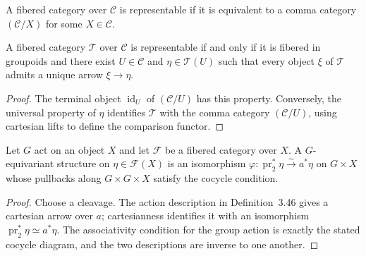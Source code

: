 \begin{definition}\label{fga-def-3-43}
A fibered category over $\mathcal C$ is representable if it is equivalent to a
comma category $(\mathcal C/X)$ for some $X\in\mathcal C$.
\end{definition}

\begin{proposition}\label{fga-pro-3-44}
A fibered category $\mathcal T$ over $\mathcal C$ is representable if and only
if it is fibered in groupoids and there exist $U\in\mathcal C$ and
$\eta\in\mathcal T(U)$ such that every object $\xi$ of $\mathcal T$ admits a
unique arrow $\xi\to\eta$.
\end{proposition}
\begin{proof}
The terminal object $\operatorname{id}_U$ of $(\mathcal C/U)$ has this property.
Conversely, the universal property of $\eta$ identifies $\mathcal T$ with the
comma category $(\mathcal C/U)$, using cartesian lifts to define the comparison
functor.
\end{proof}

\begin{proposition}\label{fga-pro-3-49}\uses{}
Let $G$ act on an object $X$ and let $\mathcal F$ be a fibered category over
$X$.  A $G$-equivariant structure on $\eta\in\mathcal F(X)$ is an isomorphism
$\varphi:\operatorname{pr}_2^*\eta\xrightarrow{\sim}a^*\eta$ on $G\times X$
whose pullbacks along $G\times G\times X$ satisfy the cocycle condition.
\end{proposition}
\begin{proof}
Choose a cleavage.  The action description in Definition~3.46 gives a
cartesian arrow over $a$; cartesianness identifies it with an isomorphism
$\operatorname{pr}_2^*\eta\simeq a^*\eta$.  The associativity condition for the
group action is exactly the stated cocycle diagram, and the two descriptions
are inverse to one another.
\end{proof}
